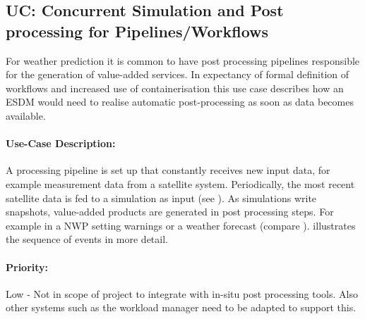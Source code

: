 %
%
%
%
%
%



\subsection{UC: Concurrent Simulation and Post processing for Pipelines/Workflows}
\label{uc: pipeline}

For weather prediction it is common to have post processing pipelines responsible for the generation of value-added services.
In expectancy of formal definition of workflows and increased use of containerisation this use case describes how an ESDM would need to realise automatic post-processing as soon as data becomes available.


\paragraph{Use-Case Description:}
A processing pipeline is set up that constantly receives new input data, for example measurement data from a satellite system.
Periodically, the most recent satellite data is fed to a simulation as input (see ).
As simulations write snapshots, value-added products are generated in post processing steps.
For example in a NWP setting warnings or a weather forecast (compare ).
 illustrates the sequence of events in more detail.




\paragraph{Priority:}
Low - Not in scope of project to integrate with in-situ post processing tools.
Also other systems such as the workload manager need to be adapted to support this.


